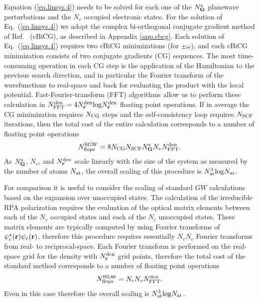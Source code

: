 \documentclass[twocolumn,prb,showpacs,superscriptaddress]{revtex4}
\def\w{\omega}
\def\G{{\bf G}}
\def\r{{\bf r}}
\begin{document}
Equation (\ref{eq.linsys.4}) needs to be solved for each one of the $N_\G^{\rm s}$ planewave perturbations
and the $N_v$ occupied electronic states. For the solution
of Eq.~(\ref{eq.linsys.4}) we adopt the complex bi-orthogonal conjugate gradient method
of Ref.~ (cBiCG), as described in Appendix \ref{app.cbcg}.
Each solution of Eq.\ (\ref{eq.linsys.4}) requires two cBiCG minimizations
(for $\pm\w$), and each cBiCG minimization consists of two conjugate gradients (CG) sequences.
The most time-consuming operation in each CG step is the application of the Hamiltonian 
to the previous search direction, and in particular
the Fourier transform of the wavefunctions to real-space and back for evaluating
the product with the local potential. Fast-Fourier-transform (FFT)
algorithms allow us to perform these calculation in $N^{\rm den}_{\rm FFT} = 4 N_\r^{\rm den} {\rm log} N_\r^{\rm den}$ floating point
operations.\cite{frigo}
If in average the CG minimization requires $N_{\rm CG}$ steps
and the self-consistency loop requires $N_{\rm SCF}$ iterations,
then the total cost of the entire calculation corresponds to a number of floating point operations
   \begin{equation}\label{eq.scaling.1}
   N^{{\rm S}GW}_{\rm flops} = 8 N_{\rm CG} N_{\rm SCF} N_\G^{\rm s}  N_v N^{\rm den}_{\rm FFT}.
   \end{equation}
As $N_\G^{\rm s}$, $N_v$, and $N_\r^{\rm den}$ scale linearly with the size of the system
as measured by the number of atoms $N_{\rm at}$,
the overall scaling of this procedure is $N_{\rm at}^3 {\rm log} N_{\rm at}$.

For comparison it is useful to consider the scaling of standard $GW$ calculations
based on the expansion over unoccupied states.\cite{hl86} 
The calculation of the irreducible RPA polarization requires the evaluation of the 
optical matrix elements between each of the $N_v$ occupied states and each of the $N_c$ unoccupied states.
These matrix elements are typically computed by using Fourier transforms of $\psi_c^\star(\r)\psi_v(\r)$,
therefore this procedure requires essentially $N_v N_c$ Fourier transforms from real- to reciprocal-space.
Each Fourier transform is performed on the real-space grid for the density with $N_\r^{\rm den}$ grid points, 
therefore the total cost of the standard method corresponds to a number of floating point operations
   \begin{equation}\label{eq.scaling.2}
   N^{\rm HL86}_{\rm flops} = N_c  N_v N^{\rm den}_{\rm FFT}.
   \end{equation}
Even in this case therefore the overall scaling is $N_{\rm at}^3 {\rm log} N_{\rm at}$.
\end{document}
